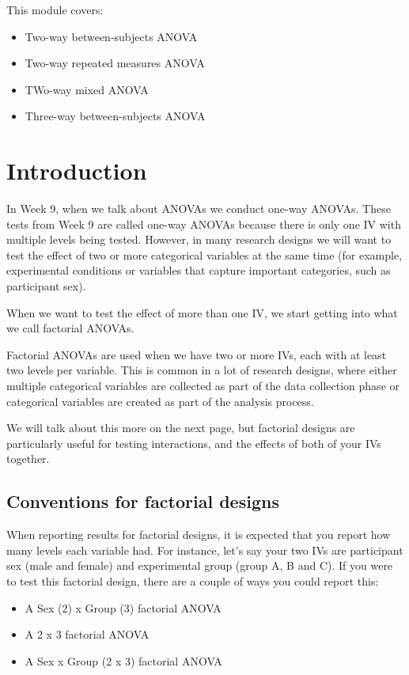 \documentclass[
]{book}
\providecommand{\tightlist}{%
  \setlength{\itemsep}{0pt}\setlength{\parskip}{0pt}}
\begin{document}
This module covers:

\begin{itemize}
\tightlist
\item
  Two-way between-subjects ANOVA
\item
  Two-way repeated measures ANOVA
\item
  TWo-way mixed ANOVA
\item
  Three-way between-subjects ANOVA
\end{itemize}

\section{Introduction}\label{factorial-intro}

In Week 9, when we talk about ANOVAs we conduct one-way ANOVAs. These tests from Week 9 are called one-way ANOVAs because there is only one IV with multiple levels being tested. However, in many research designs we will want to test the effect of two or more categorical variables at the same time (for example, experimental conditions or variables that capture important categories, such as participant sex).

When we want to test the effect of more than one IV, we start getting into what we call factorial ANOVAs.

Factorial ANOVAs are used when we have two or more IVs, each with at least two levels per variable. This is common in a lot of research designs, where either multiple categorical variables are collected as part of the data collection phase or categorical variables are created as part of the analysis process.

We will talk about this more on the next page, but factorial designs are particularly useful for testing interactions, and the effects of both of your IVs together.

\subsection{Conventions for factorial designs}\label{conventions-for-factorial-designs}

When reporting results for factorial designs, it is expected that you report how many levels each variable had. For instance, let's say your two IVs are participant sex (male and female) and experimental group (group A, B and C). If you were to test this factorial design, there are a couple of ways you could report this:

\begin{itemize}
\tightlist
\item
  A Sex (2) x Group (3) factorial ANOVA
\item
  A 2 x 3 factorial ANOVA
\item
  A Sex x Group (2 x 3) factorial ANOVA
\end{itemize}
\end{document}
